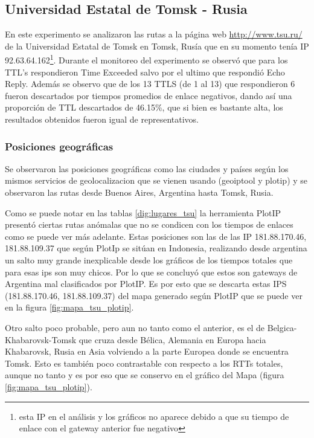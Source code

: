 \clearpage

\subsection{Universidad Estatal de Tomsk - Rusia}

En este experimento se analizaron las rutas a la página web
\url{http://www.tsu.ru/} de la Universidad Estatal de Tomsk en Tomsk, Rusía que
en su momento tenía IP 92.63.64.162\footnote{esta IP en el análisis y los
gráficos no aparece debido a que su tiempo de enlace con el gateway anterior
fue negativo}. Durante el monitoreo del experimento se observó que para los
TTL's respondieron Time Exceeded salvo por el ultimo que respondió Echo Reply.
Además se observo que de los 13 TTLS (de 1 al 13) que respondieron 6 fueron
descartados por tiempos promedios de enlace negativos, dando así una proporción
de TTL descartados de 46.15\%, que si bien es bastante alta, los resultados
obtenidos fueron igual de representativos.


\subsubsection{Posiciones geográficas}

Se observaron las posiciones geográficas como las ciudades y países según los
mismos servicios de geolocalizacion que se vienen usando (geoiptool y plotip)
y se observaron las rutas desde Buenos Aires, Argentina hasta Tomsk, Rusia.

Como se puede notar en las tablas \ref{dig:lugares_tsu} la herramienta PlotIP
presentó ciertas rutas anómalas que no se condicen con los tiempos de enlaces
como se puede ver más adelante. Estas posiciones son las de las IP
181.88.170.46, 181.88.109.37 que según PlotIp se sitúan en Indonesia,
realizando desde argentina un salto muy grande inexplicable desde los gráficos
de los tiempos totales que para esas ips son muy chicos.
Por lo que se concluyó que estos son gateways de Argentina mal clasificados por
PlotIP. Es por esto que se descarta estas IPS (181.88.170.46, 181.88.109.37)
del mapa generado según PlotIP que se puede ver en la figura
\ref{fig:mapa_tsu_plotip}.

Otro salto poco probable, pero aun no tanto como el anterior, es el de
Belgica-Khabarovsk-Tomsk que cruza desde Bélica, Alemania en Europa hacia
Khabarovsk, Rusia en Asia volviendo a la parte Europea donde se encuentra Tomsk.
Esto es también poco contrastable con respecto a los RTTs totales, aunque no tanto
y es por eso que se conservo en el gráfico del Mapa (figura \ref{fig:mapa_tsu_plotip}).

